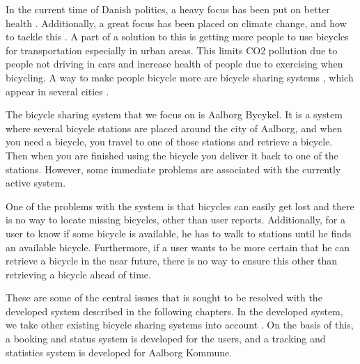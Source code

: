 	
	

In the current time of Danish politics, a heavy focus has been put on better health \citep{misc:nationalemaalhelbred}.
Additionally, a great focus has been placed on climate change, and how to tackle this \citep{misc:klima}.
A part of a solution to this is getting more people to use bicycles for transportation especially in urban areas.
This limits CO2 pollution due to people not driving in cars and increase health of people due to exercising when bicycling.
A way to make people bicycle more are bicycle sharing systems \citep{misc:impactofbikeshare}, which appear in several cities \citep{misc:cibi, misc:bycyklen, misc:AltaBicycleShare, misc:aalborgbycykelMain}.

The bicycle sharing system that we focus on is Aalborg Bycykel.
It is a system where several bicycle stations are placed around the city of Aalborg, and when you need a bicycle, you travel to one of those stations and retrieve a bicycle.
Then when you are finished using the bicycle you deliver it back to one of the stations.
However, some immediate problems are associated with the currently active system.

One of the problems with the system is that bicycles can easily get lost and there is no way to locate missing bicycles, other than user reports.
Additionally, for a user to know if some bicycle is available, he has to walk to stations until he finds an available bicycle.
Furthermore, if a user wants to be more certain that he can retrieve a bicycle in the near future, there is no way to ensure this other than retrieving a bicycle ahead of time.

These are some of the central issues that is sought to be resolved with the developed system described in the following chapters.
In the developed system, we take other existing bicycle sharing systems into account \citep{misc:cibi, misc:bycyklen, misc:AltaBicycleShare}.
On the basis of this, a booking and status system is developed for the users, and a tracking and statistics system is developed for Aalborg Kommune.